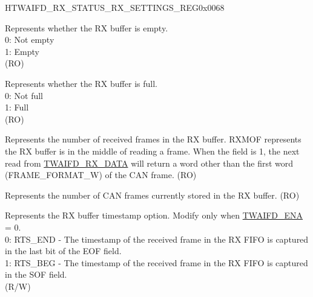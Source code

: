 \begin{register}{H}{TWAIFD\_RX\_STATUS\_RX\_SETTINGS\_REG}{0x0068}\label{regdesc:TWAIFDRXSTATUSRXSETTINGSREG}
%
%
%
%
%
%
%
%
\regnewline%
\begin{regdesc}\begin{reglist}
\label{fielddesc:TWAIFDRXE}\item [TWAIFD\_RXE] Represents whether the RX buffer is empty.\\
0: Not empty\\
1: Empty\\(RO)
\label{fielddesc:TWAIFDRXF}\item [TWAIFD\_RXF] Represents whether the RX buffer is full.\\
0: Not full\\
1: Full\\(RO)
\label{fielddesc:TWAIFDRXMOF}\item [TWAIFD\_RXMOF] Represents the number of received frames in the RX buffer. RXMOF represents the RX buffer is in the middle of reading a frame. When the field is 1, the next read from \hyperref[regdesc:TWAIFDRXDATAREG]{TWAIFD\_RX\_DATA} will return a word other than the first word (FRAME\_FORMAT\_W) of the CAN frame. (RO)
\label{fielddesc:TWAIFDRXFRC}\item [TWAIFD\_RXFRC] Represents the number of CAN frames currently stored in the RX buffer. (RO)
\label{fielddesc:TWAIFDRTSOP}\item [TWAIFD\_RTSOP] Represents the RX buffer timestamp option. Modify only when \hyperref[fielddesc:TWAIFDENA]{TWAIFD\_ENA} = 0.\\
0: RTS\_END - The timestamp of the received frame in the RX FIFO is captured in the last bit of the EOF field.\\
1: RTS\_BEG - The timestamp of the received frame in the RX FIFO is captured in the SOF field. \\(R/W)
\end{reglist}\end{regdesc}
\end{register}


